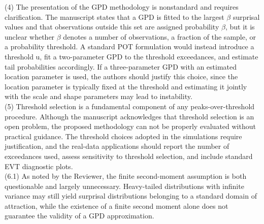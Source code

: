 \documentclass[a4paper,11pt]{article}
\begin{document}
\noindent (4) The presentation of the GPD methodology is nonstandard and requires clarification. The manuscript states that a GPD is fitted to the largest $\beta$ surprisal values and that observations outside this set are assigned probability $\beta$, but it is unclear whether $\beta$ denotes a number of observations, a fraction of the sample, or a probability threshold. A standard POT formulation would instead introduce a threshold u, fit a two-parameter GPD to the threshold exceedances, and estimate tail probabilities accordingly. If a three-parameter GPD with an estimated location parameter is used, the authors should justify this choice, since the location parameter is typically fixed at the threshold and estimating it jointly with the scale and shape parameters may lead to instability.\\

\noindent(5) Threshold selection is a fundamental component of any peaks-over-threshold procedure. Although the manuscript acknowledges that threshold selection is an open problem, the proposed methodology can not be properly evaluated without practical guidance. The threshold choices adopted in the simulations require justification, and the real-data applications should report the number of exceedances used, assess sensitivity to threshold selection, and include standard EVT diagnostic plots.\\

\noindent (6.1) As noted by the Reviewer, the finite second-moment assumption is both questionable and largely unnecessary. Heavy-tailed distributions with infinite variance may still yield surprisal distributions belonging to a standard domain of attraction, while the existence of a finite second moment alone does not guarantee the validity of a GPD approximation. \\
\end{document}
